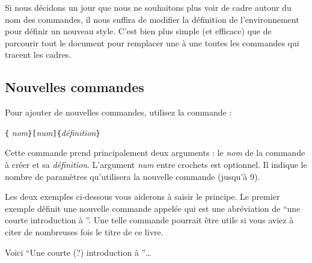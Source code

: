 Si nous décidons un jour que nous ne souhaitons plus voir de cadre
autour du nom des commandes, il nous suffira de modifier la définition
de l'environnement  pour définir un nouveau style.  C'est
bien plus simple (et efficace) que de parcourir tout le document pour
remplacer une à une toutes les commandes qui tracent les cadres.

%
%

\subsection{Nouvelles commandes}

Pour ajouter de nouvelles commandes, utilisez la commande :
\begin{lscommand}
\verb|{|%
       \emph{nom}\verb|}[|\emph{num}\verb|]{|\emph{définition}\verb|}|
\end{lscommand}
\noindent Cette commande prend principalement deux
arguments : le \emph{nom} de la commande à créer et sa
\emph{définition}. L'argument \emph{num} entre crochets est
optionnel. Il indique le nombre de paramètres  qu'utilisera la
nouvelle commande (jusqu'à 9).

Les deux exemples ci-dessous vous aiderons à saisir le principe.
Le premier exemple définit une nouvelle commande appelée 
qui est une abréviation de \enquote{une courte introduction à
\LaTeXe}. Une telle commande pourrait être utile si vous aviez à
citer de nombreuses fois le titre de ce livre.

\begin{example}
\newcommand{\ucil}
    {Une courte (?)
     introduction à \LaTeXe}
Voici \enquote{\ucil}\dots
\end{example}

